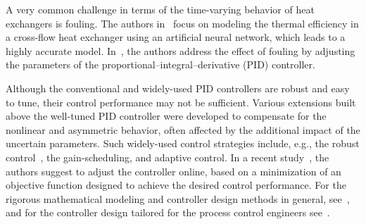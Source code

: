 \documentclass[preprint,12pt]{elsarticle}
\begin{document}
	A very common challenge in terms of the time-varying behavior of heat exchangers is fouling. The authors in~\cite{AGUEL_fouling} focus on modeling the thermal efficiency in a cross-flow heat exchanger using an artificial neural network, which leads to a highly accurate model. In~\cite{TRAFCZYNSKI_fouling}, the authors address the effect of fouling by adjusting the parameters of the proportional–integral–derivative (PID) controller. 
	
	Although the conventional and widely-used PID controllers are robust and easy to tune, their control performance may not be sufficient. Various extensions built above the well-tuned PID controller were developed to compensate for the nonlinear and asymmetric behavior, often affected by the additional impact of the uncertain parameters. Such widely-used control strategies include, e.g., the robust control~\cite{WY18}, the gain-scheduling, and adaptive control. In a recent study~\cite{VANNIEKERK_tuning}, the authors suggest to adjust the controller online, based on a minimization of an objective function designed to achieve the desired control performance. %
	For the rigorous mathematical modeling and controller design methods in general, see~\cite{MF08}, and for the controller design tailored for the process control engineers see~\cite{Liptak}.
	
\end{document}
